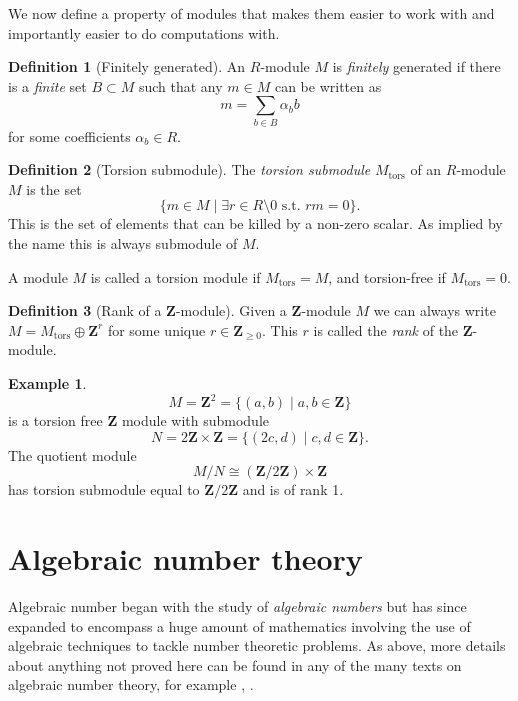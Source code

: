\documentclass[a4paper,abstracton]{scrreprt}
\theoremstyle{definition}
\newtheorem{defn}{Definition}
\newtheorem{ex}{Example}
\newcommand{\ZZ}{\mathbf{Z}}
\begin{document}
We now define a property of modules that makes them easier to work with and importantly easier to do computations with.

\begin{defn}[Finitely generated]
An $R$-module $M$ is \emph{finitely} generated if there is a \emph{finite} set $B\subset M$ such that any $m\in M$ can be written as
\[m = \sum_{b\in B} \alpha_b b\]
for some coefficients $\alpha_b \in R$.
\end{defn}

\begin{defn}[Torsion submodule]
The \emph{torsion submodule} $M_\text{tors}$ of an $R$-module $M$ is the set
\[
\{m\in M \mid \exists r \in R\setminus 0 \text{ s.t. } rm = 0\}.
\]
This is the set of elements that can be killed by a non-zero scalar.
As implied by the name this is always submodule of $M$.
\end{defn}

A module $M$ is called a torsion module if $M_\text{tors} = M$, and torsion-free if $M_\text{tors} = 0$.


\begin{defn}[Rank of a $\ZZ$-module]
Given a $\ZZ$-module $M$ we can always write $M = M_\text{tors} \oplus \ZZ^r$ for some unique $r\in \ZZ_{\ge 0}$.
This $r$ is called the \emph{rank} of the $\ZZ$-module.
\end{defn}

\begin{ex}
\[M = \ZZ^2 = \{(a,b)\mid a,b\in \ZZ\}\]
is a torsion free $\ZZ$ module with submodule
\[N = 2\ZZ\times \ZZ = \{(2c,d) \mid c,d\in\ZZ\}.\]
The quotient module
\[M/N \cong (\ZZ/2\ZZ)\times \ZZ\]
has torsion submodule equal to $\ZZ/2\ZZ$ and is of rank 1.
\end{ex}

\section{Algebraic number theory}

Algebraic number began with the study of \emph{algebraic numbers} but has since expanded to encompass a huge amount of mathematics involving the use of algebraic techniques to tackle number theoretic problems. %
As above, more details about anything not proved here can be found in any of the many texts on algebraic number theory, for example \cite{neukirch}, \cite{lang}.
\end{document}
